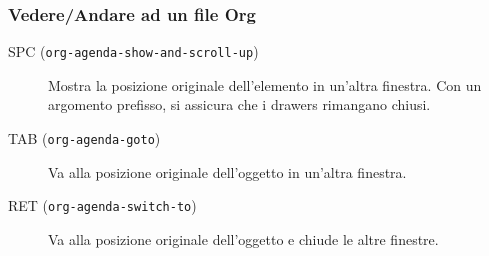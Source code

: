 \documentclass[11pt]{article}
\begin{document}
\subsubsection*{Vedere/Andare ad un file Org}
\label{sec:orgc00560c}
\begin{description}
\item[{SPC (\texttt{org-agenda-show-and-scroll-up})}] Mostra la posizione originale dell'elemento in un'altra
finestra. Con un argomento prefisso, si assicura che i drawers
rimangano chiusi.

\item[{TAB (\texttt{org-agenda-goto})}] Va alla posizione originale dell'oggetto in un'altra finestra.

\item[{RET (\texttt{org-agenda-switch-to})}] Va alla posizione originale dell'oggetto e chiude le altre finestre.
\end{description}
\end{document}
